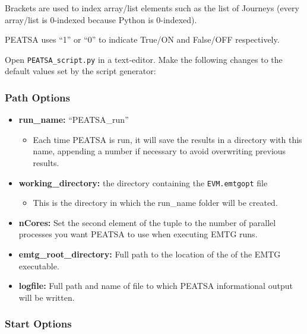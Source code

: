 \documentclass[11pt]{article}
\begin{document}
\noindent Brackets are used to index array/list elements such as the list of Journeys (every array/list is 0-indexed because Python is 0-indexed).

\noindent\ac{PEATSA} uses ``1'' or ``0'' to indicate True/ON and False/OFF respectively.

\noindent Open \texttt{PEATSA\_script.py} in a text-editor. Make the following changes to the default values set by the script generator:

\subsubsection{Path Options}
\label{sec:path_options}

\begin{itemize}
	\item\textbf{run\_name:} ``PEATSA\_run''
	\begin{itemize}
		\item Each time \ac{PEATSA} is run, it will save the results in a directory with this name, appending a number if necessary to avoid overwriting previous results.
	\end{itemize}
	\item\textbf{working\_directory:} the directory containing the \texttt{EVM.emtgopt} file
	\begin{itemize}
		\item This is the directory in which the run\_name folder will be created.
	\end{itemize}
	\item\textbf{nCores:} Set the second element of the tuple to the number of parallel processes you want \ac{PEATSA} to use when executing \ac{EMTG} runs.
	\item\textbf{emtg\_root\_directory:} Full path to the location of the of the EMTG executable.
	\item\textbf{logfile:} Full path and name of file to which \ac{PEATSA} informational output will be written.
\end{itemize}

\subsubsection{Start Options}
\label{sec:start_options}
\end{document}

